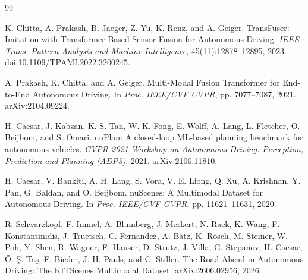\documentclass[
  english,
  10pt,
]{article}
\begin{document}
\begin{thebibliography}{99}
\begin{otherlanguage}{english}
\end{otherlanguage}

\begin{otherlanguage}{english}

K. Chitta, A. Prakash, B. Jaeger, Z. Yu, K. Renz, and A. Geiger.
TransFuser: Imitation with Transformer-Based Sensor Fusion for
Autonomous Driving. \emph{IEEE Trans. Pattern Analysis and Machine
Intelligence}, 45(11):12878--12895, 2023.
doi:10.1109/TPAMI.2022.3200245.

\end{otherlanguage}

\begin{otherlanguage}{english}

A. Prakash, K. Chitta, and A. Geiger. Multi-Modal Fusion Transformer for
End-to-End Autonomous Driving. In \emph{Proc. IEEE/CVF CVPR}, pp.
7077--7087, 2021. arXiv:2104.09224.

\end{otherlanguage}

\begin{otherlanguage}{english}

H. Caesar, J. Kabzan, K. S. Tan, W. K. Fong, E. Wolff, A. Lang, L.
Fletcher, O. Beijbom, and S. Omari. nuPlan: A closed-loop ML-based
planning benchmark for autonomous vehicles. \emph{CVPR 2021 Workshop on
Autonomous Driving: Perception, Prediction and Planning (ADP3)}, 2021.
arXiv:2106.11810.

\end{otherlanguage}

\begin{otherlanguage}{english}

H. Caesar, V. Bankiti, A. H. Lang, S. Vora, V. E. Liong, Q. Xu, A.
Krishnan, Y. Pan, G. Baldan, and O. Beijbom. nuScenes: A Multimodal
Dataset for Autonomous Driving. In \emph{Proc. IEEE/CVF CVPR}, pp.
11621--11631, 2020.

\end{otherlanguage}

\begin{otherlanguage}{english}

R. Schwarzkopf, F. Immel, A. Blumberg, J. Merkert, N. Rack, K. Wang, F.
Konstantinidis, J. Truetsch, C. Fernandez, A. Bätz, K. Rösch, M.
Steiner, W. Poh, Y. Shen, R. Wagner, F. Hauser, D. Strutz, J. Villa, G.
Stepanov, H. Caesar, Ö. Ş. Taş, F. Bieder, J.-H. Pauls, and C. Stiller.
The Road Ahead in Autonomous Driving: The KITScenes Multimodal Dataset.
arXiv:2606.02956, 2026.


\end{otherlanguage}
\end{thebibliography}
\end{document}
